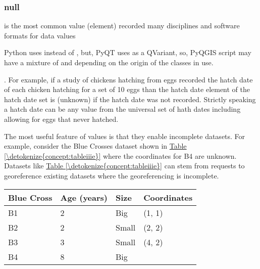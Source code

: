 \documentclass[letterpaper,11pt,english]{sphinxmanual}
\begin{document}
\subsubsection{null}
\label{\detokenize{concept:null}}
 is the most common value (element) recorded many disciplines and software formats for  data values %
\begin{footnote}[6]\sphinxAtStartFootnote
Python uses  instead of , but, PyQT uses  as a QVariant, so, PyQGIS script may have a mixture of  and  depending on the origin of the classes in use.
%
\end{footnote}.  For example, if a study of chickens hatching from eggs recorded the hatch date of each chicken hatching for a set of 10 eggs than the hatch date element of the hatch date set is  (unknown) if the hatch date was not recorded.  Strictly speaking a  hatch date can be any value from the universal set of hath dates including  allowing for eggs that never hatched.

The most useful feature of  values is that they enable incomplete datasets.  For example, consider the Blue Crosses dataset shown in \hyperref[\detokenize{concept:tableiiie}]{Table \ref{\detokenize{concept:tableiiie}}} where the coordinates for B4 are unknown. Datasets like \hyperref[\detokenize{concept:tableiiie}]{Table \ref{\detokenize{concept:tableiiie}}} can stem from requests to georeference existing datasets where the georeferencing is incomplete.


\begin{savenotes}\sphinxattablestart
\centering
{}
\label{\detokenize{concept:id54}}\label{\detokenize{concept:tableiiie}}
\sphinxaftercaption
\begin{tabulary}{\linewidth}[t]{|T|T|T|T|}
\hline
\sphinxstyletheadfamily 
Blue Cross
&\sphinxstyletheadfamily 
Age (years)
&\sphinxstyletheadfamily 
Size
&\sphinxstyletheadfamily 
Coordinates
\\
\hline
B1
&
2
&
Big
&
(1, 1)
\\
\hline
B2
&
2
&
Small
&
(2, 2)
\\
\hline
B3
&
3
&
Small
&
(4, 2)
\\
\hline
B4
&
8
&
Big
&
\\
\hline
\end{tabulary}
\par
\sphinxattableend\end{savenotes}
\end{document}
